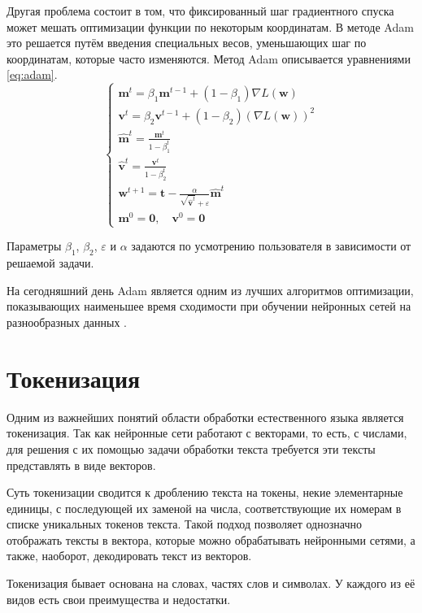 Другая проблема состоит в том, что фиксированный шаг градиентного спуска может мешать оптимизации функции по некоторым координатам. В методе Adam это решается путём введения специальных весов, уменьшающих шаг по координатам, которые часто изменяются. Метод Adam описывается уравнениями \ref*{eq:adam}.
\begin{equation}
    \label{eq:adam}
    \begin{cases}
        \mathbf{m}^t=\beta_1\mathbf{m}^{t-1}+(1-\beta_1)\nabla L(\mathbf{w}) \\
        \mathbf{v}^t=\beta_2\mathbf{v}^{t-1}+(1-\beta_2)(\nabla L(\mathbf{w}))^2 \\
        \hat{\mathbf{m}}^t=\frac{\mathbf{m}^t}{1-\beta_1^t} \\
        \hat{\mathbf{v}}^t=\frac{\mathbf{v}^t}{1-\beta_2^t} \\
        \mathbf{w}^{t+1}=\mathbf{t}-\frac{\alpha}{\sqrt{\hat{\mathbf{v}}^t}+\varepsilon}\hat{\mathbf{m}}^t \\
        \mathbf{m}^0=\mathbf{0},\quad\mathbf{v}^0=\mathbf{0}
    \end{cases}
\end{equation}

Параметры $\beta_1$, $\beta_2$, $\varepsilon$ и $\alpha$ задаются по усмотрению пользователя в зависимости от решаемой задачи.

На сегодняшний день Adam является одним из лучших алгоритмов оптимизации, показывающих наименьшее время сходимости при обучении нейронных сетей на разнообразных данных \cite{art:optimizers}.

\section{Токенизация}

Одним из важнейших понятий области обработки естественного языка является токенизация. Так как нейронные сети работают с векторами, то есть, с числами, для решения с их помощью задачи обработки текста требуется эти тексты представлять в виде векторов.

Суть токенизации сводится к дроблению текста на токены, некие элементарные единицы, с последующей их заменой на числа, соответствующие их номерам в списке уникальных токенов текста. Такой подход позволяет однозначно отображать тексты в вектора, которые можно обрабатывать нейронными сетями, а также, наоборот, декодировать текст из векторов.

Токенизация бывает основана на словах, частях слов и символах. У каждого из её видов есть свои преимущества и недостатки.

